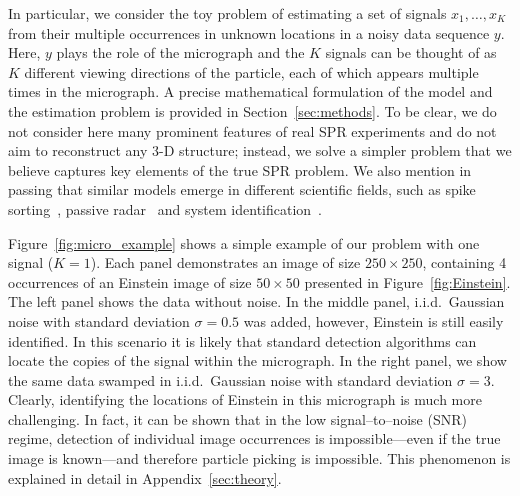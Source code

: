 \documentclass[english,11pt]{article}
\numberwithin{equation}{section}
\theoremstyle{plain}
\theoremstyle{definition}
\theoremstyle{remark}
\theoremstyle{plain}
\theoremstyle{remark}
\theoremstyle{plain}
\theoremstyle{plain}
\newcommand{\SNR}{{\textsf{SNR}}}
\begin{document}
In particular, we consider the toy problem of estimating a set of signals $x_1,\ldots,x_K$ from their multiple occurrences in unknown  locations in a noisy data sequence $y$. Here, $y$ plays the role of the micrograph and the $K$ signals can be thought of as $K$ different viewing directions of the particle, each of which  appears multiple times in the micrograph. 
A precise mathematical formulation of the model and the estimation problem is provided in Section~\ref{sec:methods}.
To be clear, we do not consider here many prominent features of real SPR experiments and do not aim to reconstruct any 3-D structure; instead, we solve a simpler problem that we believe captures key elements of the true SPR problem. We also mention in passing that similar models emerge in different scientific fields, such as spike sorting~\cite{lewicki1998review}, passive radar~\cite{gogineni2017passive} and system identification~\cite{ljung1998system}.

Figure~\ref{fig:micro_example} shows a simple example of our problem with  one signal ($K=1$). 
Each panel demonstrates an image of size $250\times 250$, containing 4 occurrences of an Einstein image of size $50\times 50$ presented in Figure~\ref{fig:Einstein}. 
The left panel shows the data without noise. In the middle panel,  i.i.d.\ Gaussian noise with standard deviation $\sigma=0.5$  was added, however,  Einstein is still easily identified. In this scenario it is likely that standard detection algorithms can locate the copies of the signal within the micrograph. In the right panel, we show the same data swamped in  
i.i.d.\ Gaussian noise with standard deviation  $\sigma=3$.
Clearly, identifying the locations of Einstein in this micrograph is much more challenging. In fact, it can be shown that in the low signal--to--noise (\SNR) regime, 
detection  of individual image occurrences is impossible---even if the true image is known---and therefore particle picking is impossible.  This phenomenon is explained in detail in Appendix~\ref{sec:theory}.
\end{document}
